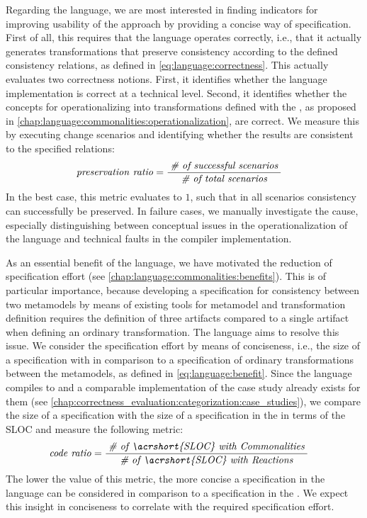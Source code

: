 Regarding the \commonalities language, we are most interested in finding indicators for improving usability of the \commonalities approach by providing a concise way of specification.
First of all, this requires that the language operates correctly, i.e., that it actually generates transformations that preserve consistency according to the defined consistency relations, as defined in \autoref{eq:language:correctness}.
This actually evaluates two correctness notions. 
First, it identifies whether the language implementation is correct at a technical level.
Second, it identifies whether the concepts for operationalizing \commonalities into transformations defined with the \reactionslanguage, as proposed in \autoref{chap:language:commonalities:operationalization}, are correct.
We measure this by executing change scenarios and identifying whether the results are consistent to the specified relations:
\begin{align*}
    &
    \mathit{preservation\ ratio} = \frac{\; \textit{\# of successful scenarios} \;}{\; \textit{\# of total scenarios} \;}
\end{align*}
In the best case, this metric evaluates to $1$, such that in all scenarios consistency can successfully be preserved.
In failure cases, we manually investigate the cause, especially distinguishing between conceptual issues in the operationalization of the \commonalities language and technical faults in the compiler implementation.

As an essential benefit of the \commonalities language, we have motivated the reduction of specification effort (see \autoref{chap:language:commonalities:benefits}).
This is of particular importance, because developing a \commonalities specification for consistency between two metamodels by means of existing tools for metamodel and transformation definition requires the definition of three artifacts compared to a single artifact when defining an ordinary transformation.
The \commonalities language aims to resolve this issue.
We consider the specification effort by means of conciseness, i.e., the size of a specification with \commonalities in comparison to a specification of ordinary transformations between the metamodels, as defined in \autoref{eq:language:benefit}.
Since the \commonalities language compiles to \reactions and a comparable implementation of the case study already exists for them (see \autoref{chap:correctness_evaluation:categorization:case_studies}), we compare the size of a \commonalities specification with the size of a specification in the \reactionslanguage in terms of the \gls{SLOC} and measure the following metric:
\begin{align*}
    &
    \mathvariable{code\ ratio} = \frac{\mathtextspacearound{\# of \acrshort{SLOC} with \commonalities}}{\mathtextspacearound{\# of \acrshort{SLOC} with \reactions}}
\end{align*}
The lower the value of this metric, the more concise a specification in the \commonalities language can be considered in comparison to a specification in the \reactionslanguage.
We expect this insight in conciseness to correlate with the required specification effort.


